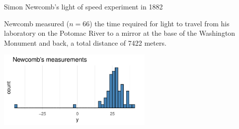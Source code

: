 \documentclass[finnish,english,t]{beamer}
\begin{document}
\begin{frame}
  
  {\large\color{navyblue} Simon Newcomb's light of speed experiment in 1882}

  {\small
  Newcomb measured ($n=66$) the time required for light to travel from
  his laboratory on the Potomac River to a mirror at the base of the
  Washington Monument and back, a total distance of 7422 meters.}
  \begin{center}
    \vspace{-0.5\baselineskip}
    {\includegraphics[width=7.5cm]{newcomb_data.pdf}}\\
    \vspace{-1\baselineskip}
  \end{center}

\end{frame}
\end{document}
